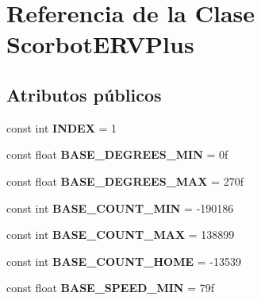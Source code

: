 \hypertarget{class_scorbot_e_r_v_plus}{}\section{Referencia de la Clase Scorbot\+E\+R\+V\+Plus}
\label{class_scorbot_e_r_v_plus}
\subsection*{Atributos públicos}
\begin{DoxyCompactItemize}
\item 
\mbox{\label{class_scorbot_e_r_v_plus_a39277ade90b7379615feb1d49b1595ff}} 
const int {\bfseries I\+N\+D\+EX} = 1
\item 
\mbox{\label{class_scorbot_e_r_v_plus_a83ed9065cb4e0f810ea9b232aeaa38c0}} 
const float {\bfseries B\+A\+S\+E\+\_\+\+D\+E\+G\+R\+E\+E\+S\+\_\+\+M\+IN} = 0f
\item 
\mbox{\label{class_scorbot_e_r_v_plus_ab465d61f3d062c26b194859a5bab41b7}} 
const float {\bfseries B\+A\+S\+E\+\_\+\+D\+E\+G\+R\+E\+E\+S\+\_\+\+M\+AX} = 270f
\item 
\mbox{\label{class_scorbot_e_r_v_plus_ac514e69b6ff313f215a800936dc50149}} 
const int {\bfseries B\+A\+S\+E\+\_\+\+C\+O\+U\+N\+T\+\_\+\+M\+IN} = -\/190186
\item 
\mbox{\label{class_scorbot_e_r_v_plus_afde727c33c8d0cc003b2f49ab536eba2}} 
const int {\bfseries B\+A\+S\+E\+\_\+\+C\+O\+U\+N\+T\+\_\+\+M\+AX} = 138899
\item 
\mbox{\label{class_scorbot_e_r_v_plus_ae7a67981cf8958d87b36aa8e47fbbf06}} 
const int {\bfseries B\+A\+S\+E\+\_\+\+C\+O\+U\+N\+T\+\_\+\+H\+O\+ME} = -\/13539
\item 
\mbox{\label{class_scorbot_e_r_v_plus_af1ea7c400e83cdae45bca92c9cc2e6b1}} 
const float {\bfseries B\+A\+S\+E\+\_\+\+S\+P\+E\+E\+D\+\_\+\+M\+IN} = 79f
\item 
\mbox{\label{class_scorbot_e_r_v_plus_a92933bf3621669210a3ffb5bfa47674e}} 

\end{DoxyCompactItemize}
